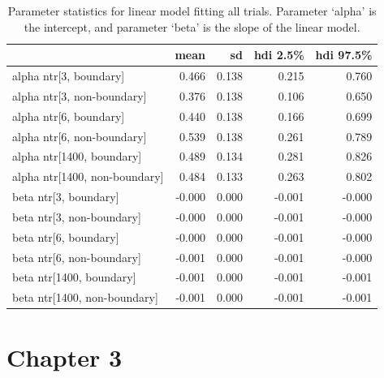 \begin{table}[H]
    \centering
    \begin{tabular}{lrrrr}
        \toprule
         & mean & sd & hdi 2.5\% & hdi 97.5\% \\
        \midrule
        alpha ntr[3, boundary] & 0.466 & 0.138 & 0.215 & 0.760 \\
        alpha ntr[3, non-boundary] & 0.376 & 0.138 & 0.106 & 0.650 \\
        alpha ntr[6, boundary] & 0.440 & 0.138 & 0.166 & 0.699 \\
        alpha ntr[6, non-boundary] & 0.539 & 0.138 & 0.261 & 0.789 \\
        alpha ntr[1400, boundary] & 0.489 & 0.134 & 0.281 & 0.826 \\
        alpha ntr[1400, non-boundary] & 0.484 & 0.133 & 0.263 & 0.802 \\
        beta ntr[3, boundary] & -0.000 & 0.000 & -0.001 & -0.000 \\
        beta ntr[3, non-boundary] & -0.000 & 0.000 & -0.001 & -0.000 \\
        beta ntr[6, boundary] & -0.000 & 0.000 & -0.001 & -0.000 \\
        beta ntr[6, non-boundary] & -0.001 & 0.000 & -0.001 & -0.000 \\
        beta ntr[1400, boundary] & -0.001 & 0.000 & -0.001 & -0.001 \\
        beta ntr[1400, non-boundary] & -0.001 & 0.000 & -0.001 & -0.001 \\
        \bottomrule
    \end{tabular}        
    \caption{Parameter statistics for linear model fitting all trials. Parameter `alpha' is the intercept, and parameter `beta' is the slope of the linear model.}
    \label{tab:allblocks-trial-ppt-lag}         
\end{table}

\chapter{Chapter 3}

